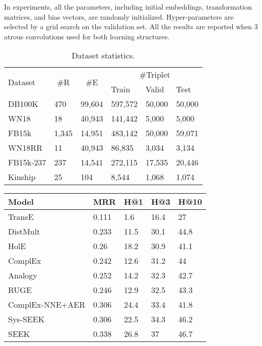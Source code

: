\documentclass[11pt]{article}
\begin{document}
In experiments, all the parameters, including initial embeddings, transformation matrices, and bias vectors,  are randomly initialized. Hyper-parameters are selected by a grid search on the validation set. All the results are reported when 3 atrous convolutions used for both learning structures. 






\begin{table}[t]
	\centering
\begin{tabular}{llllll}
		\toprule
		\multirow{2}[4]{*}{Dataset} & \multicolumn{1}{c}{\multirow{2}[4]{*}{\#R}} & \multicolumn{1}{c}{\multirow{2}[4]{*}{\#E}} & \multicolumn{3}{c}{\#Triplet} \\
		\cmidrule{4-6}          &       &       & \multicolumn{1}{l}{Train} & \multicolumn{1}{l}{Valid} & \multicolumn{1}{l}{Test} \\
		\midrule
		DB100K  & 470    & 99,604 & 597,572 & 50,000 & 50,000 \\
		WN18  & 18    & 40,943 & 141,442 & 5,000 & 5,000 \\
		FB15k & 1,345 & 14,951 & 483,142 & 50,000 & 59,071 \\
		WN18RR & 11    & 40,943 & 86,835 & 3,034 & 3,134 \\
		FB15k-237 & 237   & 14,541 & 272,115 & 17,535 & 20,446 \\
		Kinship & 25    & 104   & 8,544 & 1,068 & 1,074 \\
		\hline
	\end{tabular}\caption{Dataset statistics.}
	\label{tab:stas}\end{table}\begin{table}[t]
	\centering
	
	\begin{tabular}{lllll}
		\toprule
		Model & \multicolumn{1}{l}{MRR} & \multicolumn{1}{l}{H@1} & \multicolumn{1}{l}{H@3} & \multicolumn{1}{l}{H@10} \\
		\midrule
		TransE\cite{Bordes:2013} & 0.111 & 1.6   & 16.4  & 27 \\
		DistMult\cite{Yang:2015} & 0.233 & 11.5  & 30.1  & 44.8 \\
		HolE\cite{Nickel:2016}  & 0.26  & 18.2  & 30.9  & 41.1 \\
		ComplEx\cite{Trouillon:2016} & 0.242 & 12.6  & 31.2  & 44 \\
		Analogy\cite{Liu:2017} & 0.252 & 14.2  & 32.3  & 42.7 \\
		RUGE\cite{Guo:2018}  & 0.246 & 12.9  & 32.5  & 43.3 \\
		ComplEx-NNE+AER\cite{Ding:2018} & 0.306 & 24.4  & 33.4  & 41.8 \\
		Sys-SEEK\cite{Xu:2020} & 0.306 & 22.5  & 34.3  & 46.2 \\
		SEEK\cite{Xu:2020}  & 0.338 & 26.8  & 37    & 46.7 \\
		\midrule
		

\end{tabular}
\end{table}
\end{document}
